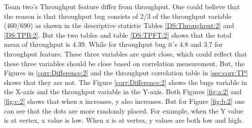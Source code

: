 \documentclass[UKenglish]{ifimaster}  %
\begin{document}
Team two's Throughput feature differ from throughput. One could believe that the reason is that throughput bug consists of 2/3 of the throughput variable (460/690) as shown in the descriptive statistic Tables \ref{DS:Throughput:2} and \ref{DS:TPB:2}. But the two tables and table \ref{DS:TPFT:2} shows that the total mean of throughput is 4.39. While for throughput bug it's 4.8 and 3.7 for throughput feature. These three variables are quiet close, which could reflect that these three variables should be close based on correlation measurement. But, the Figures in \ref{corr:Difference:2} and the throughput correlation table in \ref{sec:corr:TP} shows that they are not. The Figure \ref{corr:Difference:2} shows the bugs variable in the X-axis and the throughput variable in the Y-axis. Both Figures \ref{fig:a:2} and \ref{fig:c:2} shows that when x increases, y also increases. But for Figure \ref{fig:b:2} one can see that the dots are more randomly placed. For example, when the Y value is at vertex, x value is low.  When x is at vertex, y values are both low and high.  
\end{document}
